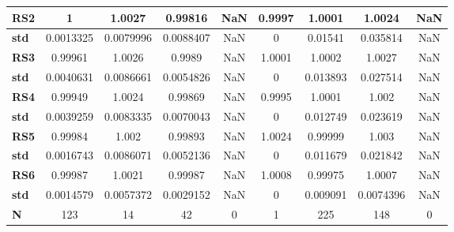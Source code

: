 {\begin{tabular}{lcccccccc}
\textbf{RS2}&1&1.0027&0.99816&NaN&0.9997&1.0001&1.0024&NaN\\\midrule
\textbf{std}&0.0013325&0.0079996&0.0088407&NaN&0&0.01541&0.035814&NaN\\\midrule
\textbf{RS3}&0.99961&1.0026&0.9989&NaN&1.0001&1.0002&1.0027&NaN\\\midrule
\textbf{std}&0.0040631&0.0086661&0.0054826&NaN&0&0.013893&0.027514&NaN\\\midrule
\textbf{RS4}&0.99949&1.0024&0.99869&NaN&0.9995&1.0001&1.002&NaN\\\midrule
\textbf{std}&0.0039259&0.0083335&0.0070043&NaN&0&0.012749&0.023619&NaN\\\midrule
\textbf{RS5}&0.99984&1.002&0.99893&NaN&1.0024&0.99999&1.003&NaN\\\midrule
\textbf{std}&0.0016743&0.0086071&0.0052136&NaN&0&0.011679&0.021842&NaN\\\midrule
\textbf{RS6}&0.99987&1.0021&0.99987&NaN&1.0008&0.99975&1.0007&NaN\\\midrule
\textbf{std}&0.0014579&0.0057372&0.0029152&NaN&0&0.009091&0.0074396&NaN\\\midrule
\textbf{N}&123&14&42&0&1&225&148&0\\
\bottomrule
\end{tabular}
}